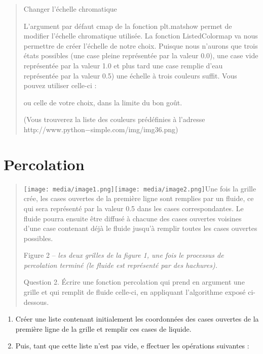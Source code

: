 \documentclass[]{article}
\begin{document}
\begin{quote}
Changer l'échelle chromatique

L'argument par défaut cmap de la fonction plt.matshow permet de modifier
l'échelle chromatique utilisée. La fonction ListedColormap va nous
permettre de créer l'échelle de notre choix. Puisque nous n'aurons que
trois états possibles (une case pleine représentée par la valeur 0.0),
une case vide représentée par la valeur 1.0 et plus tard une case
remplie d'eau représentée par la valeur 0.5) une échelle à trois
couleurs suffit. Vous pouvez utiliser celle-ci :

ou celle de votre choix, dans la limite du bon goût.

(Vous trouverez la liste des couleurs prédéfinies à l'adresse
http://www.python−simple.com/img/img36.png)
\end{quote}

\section{Percolation}\label{percolation}

\begin{quote}
\texttt{[image: media/image1.png]}\texttt{[image: media/image2.png]}Une
fois la grille crée, les cases ouvertes de la première ligne sont
remplies par un fluide, ce qui sera représenté par la valeur 0.5 dans
les cases correspondantes. Le fluide pourra ensuite être diffusé à
chacune des cases ouvertes voisines d'une case contenant déjà le fluide
jusqu'à remplir toutes les cases ouvertes possibles.

Figure 2 -- \emph{les deux grilles de la figure 1, une fois le processus
de percolation terminé (le fluide est représenté par des hachures).}

Question 2. Écrire une fonction percolation qui prend en argument une
grille et qui remplit de fluide celle-ci, en appliquant l'algorithme
exposé ci-dessous.
\end{quote}

\begin{enumerate}
\def\labelenumi{(\roman{enumi})}
\item
  Créer une liste contenant initialement les coordonnées des cases
  ouvertes de la première ligne de la grille et remplir ces cases de
  liquide.
\item
  Puis, tant que cette liste n'est pas vide, e ffectuer les opérations
  suivantes :
\end{enumerate}
\end{document}
